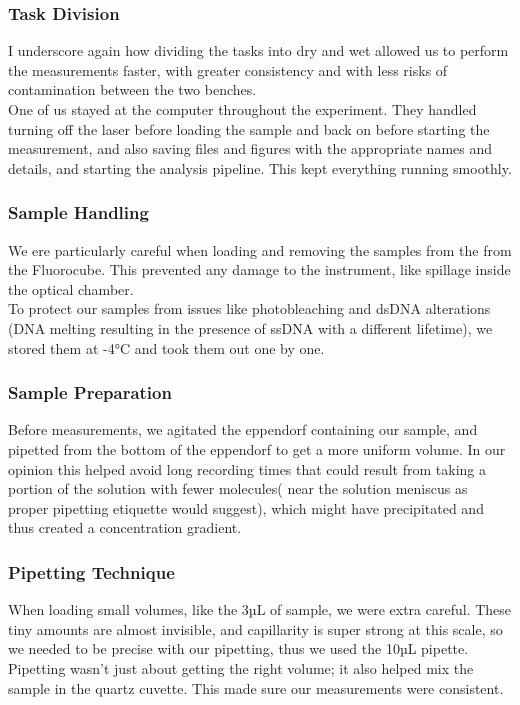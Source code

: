 \documentclass[a4paper,english,12pt,bibliography=totoc]{scrreprt}
\begin{document}
\subsubsection{Task Division}
I underscore again how dividing the tasks into dry and wet allowed us to perform the measurements faster, with greater consistency and with less risks of contamination between the two benches.\\

One of us stayed at the computer throughout the experiment. They handled turning off the laser before loading the sample and back on before starting the measurement, and also saving files and figures with the appropriate names and details, and starting the analysis pipeline. This kept everything running smoothly.\\
\subsubsection{Sample Handling}
We ere particularly careful when loading and removing the samples from the from the Fluorocube. This prevented any damage to the instrument, like spillage inside the optical chamber.\\

To protect our samples from issues like photobleaching and dsDNA alterations (DNA melting resulting in the presence of ssDNA with a different lifetime), we stored them at -4°C and took them out one by one.\\
\subsubsection{Sample Preparation}
Before measurements, we agitated the eppendorf containing our sample, and pipetted from the bottom of the eppendorf to get a more uniform volume. In our opinion this helped avoid long recording times that could result from taking a portion of the solution with fewer molecules( near the solution meniscus as proper pipetting etiquette would suggest), which might have precipitated and thus created a concentration gradient.\\
\subsubsection{Pipetting Technique}
When loading small volumes, like the 3µL of sample, we were extra careful. These tiny amounts are almost invisible, and capillarity is super strong at this scale, so we needed to be precise with our pipetting, thus we used the 10µL pipette. Pipetting wasn't just about getting the right volume; it also helped mix the sample in the quartz cuvette. This made sure our measurements were consistent.\\
\end{document}
